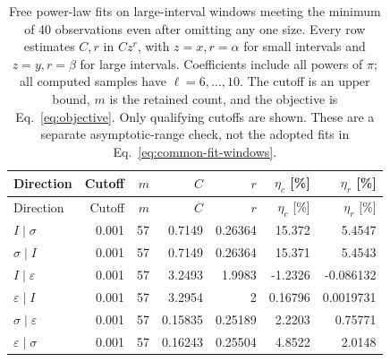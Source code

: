 \begin{longtable}{lrrrrrr}
\caption{Free power-law fits on large-interval windows meeting the minimum of 40 observations even after omitting any one size. Every row estimates $C,r$ in $Cz^r$, with $z=x,r=\alpha$ for small intervals and $z=y,r=\beta$ for large intervals. Coefficients include all powers of $\pi$; all computed samples have $\ell=6,\ldots,10$. The cutoff is an upper bound, $m$ is the retained count, and the objective is Eq.~\eqref{eq:objective}. Only qualifying cutoffs are shown. These are a separate asymptotic-range check, not the adopted fits in Eq.~\eqref{eq:common-fit-windows}.}
\label{tab:ising-large-windows}\\\toprule
Direction & Cutoff & $m$ & $C$ & $r$ & $\eta_c$ [\%] & $\eta_r$ [\%]\\\midrule
\endfirsthead
\toprule
Direction & Cutoff & $m$ & $C$ & $r$ & $\eta_c$ [\%] & $\eta_r$ [\%]\\\midrule
\endhead
\bottomrule\endfoot
$I\mid \sigma$ & 0.001 & 57 & 0.7149 & 0.26364 & 15.372 & 5.4547\\
$\sigma\mid I$ & 0.001 & 57 & 0.7149 & 0.26364 & 15.371 & 5.4543\\
$I\mid \varepsilon$ & 0.001 & 57 & 3.2493 & 1.9983 & -1.2326 & -0.086132\\
$\varepsilon\mid I$ & 0.001 & 57 & 3.2954 & 2 & 0.16796 & 0.0019731\\
$\sigma\mid \varepsilon$ & 0.001 & 57 & 0.15835 & 0.25189 & 2.2203 & 0.75771\\
$\varepsilon\mid \sigma$ & 0.001 & 57 & 0.16243 & 0.25504 & 4.8522 & 2.0148\\
\end{longtable}

